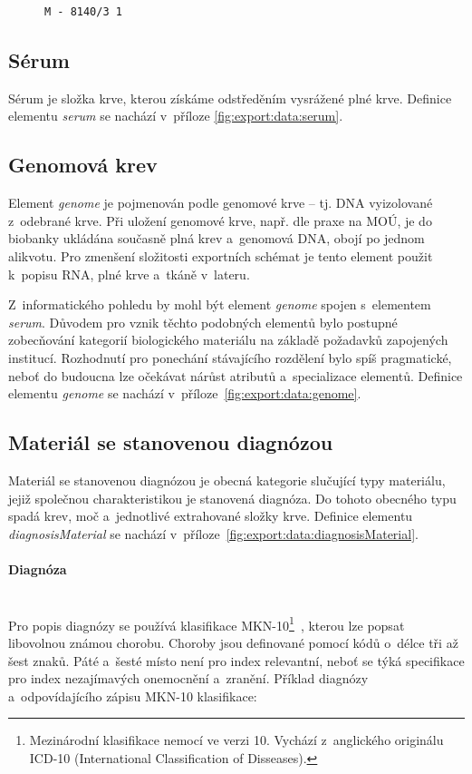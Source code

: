 \documentclass[11pt, final, oneside]{fithesis2}
\newcommand{\paragraphNewLine}[1]{\paragraph*{#1}\mbox{}\\}
\begin{document}
\begin{figure}[h!] %
\centering
\begin{BVerbatim}
M - 8140/3 1
\end{BVerbatim}
\end{figure}

\subsection{Sérum}
Sérum je složka krve, kterou získáme odstředěním vysrážené plné krve. Definice elementu \textit{serum} se nachází v~příloze \ref{fig:export:data:serum}.

\subsection{Genomová krev}
Element \textit{genome} je pojmenován podle genomové krve -- tj. DNA vyizolované z~odebrané krve. Při uložení genomové krve, např. dle praxe na MOÚ, je do biobanky ukládána současně plná krev a~genomová DNA, obojí po jednom alikvotu.
Pro zmenšení složitosti exportních schémat je tento element použit k~popisu RNA, plné krve a~tkáně v~lateru.

Z~informatického pohledu by mohl být element \textit{genome} spojen s~elementem \textit{serum}. Důvodem pro vznik těchto podobných elementů bylo postupné zobecňování kategorií biologického materiálu na základě požadavků zapojených institucí. Rozhodnutí pro ponechání stávajícího rozdělení bylo spíš pragmatické, neboť do budoucna lze očekávat nárůst atributů a~specializace elementů. Definice elementu \textit{genome} se nachází v~příloze~\ref{fig:export:data:genome}.

\subsection{Materiál se stanovenou diagnózou}
Materiál se stanovenou diagnózou je obecná kategorie slučující typy materiálu, jejiž společnou charakteristikou je stanovená diagnóza. Do tohoto obecného typu spadá krev, moč a~jednotlivé extrahované složky krve.
Definice elementu \textit{diagnosisMaterial} se nachází v~příloze~\ref{fig:export:data:diagnosisMaterial}.

\paragraphNewLine{Diagnóza}
Pro popis diagnózy se používá klasifikace MKN-10\footnote{Mezinárodní klasifikace nemocí ve verzi 10. Vychází z~anglického originálu ICD-10 (International Classification of Disseases).}~\cite{MKN-10}, kterou lze popsat libovolnou známou chorobu.
Choroby jsou definované pomocí kódů o~délce tři až šest znaků. Páté a~šesté místo není pro index relevantní, neboť se týká specifikace pro index nezajímavých onemocnění a~zranění. 
Příklad diagnózy a~odpovídajícího zápisu MKN-10 klasifikace:
\end{document}
